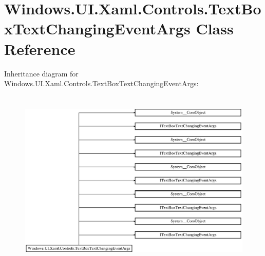 \hypertarget{class_windows_1_1_u_i_1_1_xaml_1_1_controls_1_1_text_box_text_changing_event_args}{}\section{Windows.\+U\+I.\+Xaml.\+Controls.\+Text\+Box\+Text\+Changing\+Event\+Args Class Reference}
\label{class_windows_1_1_u_i_1_1_xaml_1_1_controls_1_1_text_box_text_changing_event_args}
Inheritance diagram for Windows.\+U\+I.\+Xaml.\+Controls.\+Text\+Box\+Text\+Changing\+Event\+Args\+:\begin{figure}[H]
\begin{center}
\leavevmode
\includegraphics[height=8.750000cm]{class_windows_1_1_u_i_1_1_xaml_1_1_controls_1_1_text_box_text_changing_event_args}
\end{center}
\end{figure}
